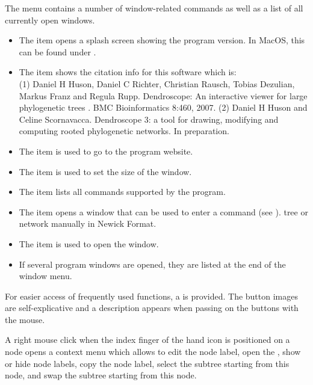 \documentclass[11pt]{article}
\begin{document}
The  menu contains a number of window-related commands
as well as a list of all currently open windows.
\begin{itemize}
\item The  item opens a splash screen showing the program version. In MacOS, this can be found under .
\item The  item shows the citation info for this software which is:\\
(1) Daniel H Huson, Daniel C Richter, Christian Rausch, Tobias Dezulian, Markus Franz and Regula Rupp. Dendroscope: An interactive viewer for large phylogenetic trees . BMC Bioinformatics 8:460, 2007. (2) Daniel H Huson and Celine Scornavacca.  Dendroscope 3: a tool for drawing, modifying and computing rooted phylogenetic networks. In preparation.
	\item The  item is used to go to the program website.
\item The  item is used to set the
size of the  window.
\item The  item lists all commands supported by the program.
\item The  item opens a window that can be used to enter a command (see ).
tree or network manually in Newick Format. 
\item The  item is used to open the  window.
\item If several program windows are opened, they are listed at the end of the window menu.
\end{itemize}

For easier access of frequently used functions, a  is provided.
The button images are self-explicative and a description appears when passing on the buttons with the mouse.


A right mouse click when the index finger of the hand icon is positioned on a node opens a context menu which allows to
edit the node label, open the , show or hide node labels, copy the node label, select the subtree starting from this node, and swap the subtree starting from this node.
\end{document}
